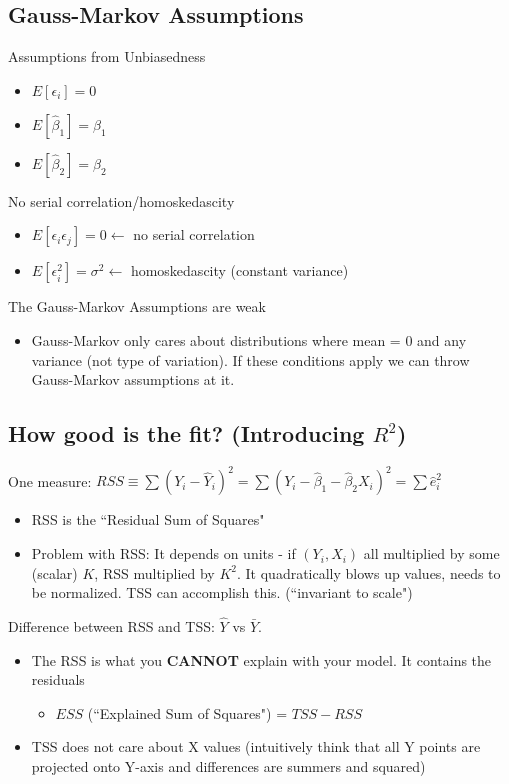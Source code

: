 \documentclass[10pt, oneside]{article}
\begin{document}
\subsection{Gauss-Markov Assumptions}
{Assumptions from Unbiasedness}
\begin{itemize}
    \item $E[\epsilon_i] = 0$
    \item $E[\hat \beta_1] = \beta_1$
    \item $E[\hat \beta_2] = \beta_2$
\end{itemize}
{No serial correlation/homoskedascity}
\begin{itemize}
    \item $E[\epsilon_i\epsilon_j] = 0 \leftarrow $ no serial correlation
    \item $E[\epsilon_i^2] = \sigma^2 \leftarrow $ homoskedascity (constant variance)
\end{itemize}
The Gauss-Markov Assumptions are weak
\begin{itemize}
    \item Gauss-Markov only cares about distributions where mean = 0 and any variance (not type of variation). If these conditions apply we can throw Gauss-Markov assumptions at it.
\end{itemize}

\subsection{How good is the fit? (Introducing $R^2$)}
One measure: $RSS\equiv \sum(Y_i-\hat Y_i)^2 = \sum(Y_i -\hat \beta_1 -\hat \beta_2X_i)^2 = \sum \hat e_i^2$
\begin{itemize}
    \item RSS is the ``Residual Sum of Squares"
    \item Problem with RSS: It depends on units - if $(Y_i, X_i)$ all multiplied by some (scalar) $K$, RSS multiplied by $K^2$. It quadratically blows up values, needs to be normalized. TSS can accomplish this. (``invariant to scale")
\end{itemize}
Difference between RSS and TSS: $\hat Y$ vs $\bar Y$.
\begin{itemize}
    \item The RSS is what you \textbf{CANNOT} explain with your model. It contains the residuals
    \begin{itemize}
        \item $ESS$ (``Explained Sum of Squares") = $TSS-RSS$
    \end{itemize}
    \item TSS does not care about X values (intuitively think that all Y points are projected onto Y-axis and differences are summers and squared)
\end{itemize}
\end{document}
